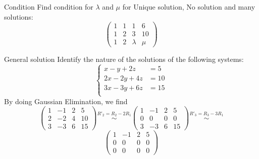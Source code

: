 \documentclass[11pt]{beamer}
\theoremstyle{plain}
\begin{document}
\begin{frame}{Condition}
Find condition for $\lambda$ and $\mu$ for Unique solution, No solution and many solutions:
    $$
    \left(\begin{array}{ccc|c}
        1&1&1&6\\
        1&2&3&10\\
        1&2&\lambda&\mu 
    \end{array}\right)
    $$
\end{frame}
\begin{frame}{General solution}
Identify the nature of the solutions of the following systems: 
$$
\begin{cases}
    x-y+2z&=5\\
    2x-2y+4z&=10\\
    3x-3y+6z&=15\\ 
\end{cases}
$$
By doing Gaussian Elimination, we find
$$
\left(\begin{array}{ccc|c}
    1&-1&2&5\\
    2&-2&4&10\\
    3&-3&6&15
\end{array}\right)\stackrel{R'_2=R_2-2R_1}{\sim}
\left(\begin{array}{ccc|c}
    1&-1&2&5\\
    0&0&0&0\\
    3&-3&6&15
\end{array}\right)\stackrel{R'_3=R_3-3R_1}{\sim}
$$
$$
\left(\begin{array}{ccc|c}
    1&-1&2&5\\
    0&0&0&0\\
    0&0&0&0
\end{array}\right)
$$
\end{frame}
\end{document}
